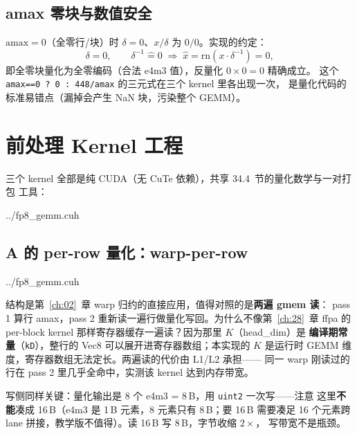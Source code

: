 \subsection{amax 零块与数值安全}

$\mathrm{amax}=0$（全零行/块）时 $\delta=0$、$x/\delta$ 为 $0/0$。实现的约定：
\begin{equation}
  \delta = 0,\qquad \delta^{-1} \mathrel{\hat=} 0
  \;\Longrightarrow\; \hat{x} = \mathrm{rn}(x\cdot\delta^{-1}) = 0,
\end{equation}
即全零块量化为全零编码（合法 e4m3 值），反量化 $0\times 0 = 0$ 精确成立。
这个 \texttt{amax==0 ? 0 : 448/amax} 的三元式在三个 kernel 里各出现一次，
是量化代码的标准易错点（漏掉会产生 NaN 块，污染整个 GEMM）。

\section{前处理 Kernel 工程}\label{sec:34-kernels}

三个 kernel 全部是纯 CUDA（无 CuTe 依赖），共享 34.4~节的量化数学与一对打包
工具：

\begin{lstinputlisting}[linerange={50-82},firstnumber=auto,
  title={fp8\_gemm.cuh L50-82（量化常数、粒度枚举、Vec8 与 e4m3x2 打包）}]{../fp8_gemm.cuh}
\end{lstinputlisting}

\subsection{A 的 per-row 量化：warp-per-row}

\begin{lstinputlisting}[linerange={91-128},firstnumber=auto,
  title={fp8\_gemm.cuh L91-128（quantize\_a\_perrow\_kernel：warp 归约 + 两遍 gmem）}]{../fp8_gemm.cuh}
\end{lstinputlisting}

结构是第~\ref{ch:02}~章 warp 归约的直接应用，值得对照的是\textbf{两遍 gmem 读}：
pass 1 算行 amax，pass 2 重新读一遍行做量化写回。为什么不像第~\ref{ch:28}~章
ffpa 的 per-block kernel 那样寄存器缓存一遍读？因为那里 $K$（head\_dim）是
\textbf{编译期常量}（\texttt{kD}），整行的 Vec8 可以展开进寄存器数组；本实现的
$K$ 是运行时 GEMM 维度，寄存器数组无法定长。两遍读的代价由 L1/L2 承担——
同一 warp 刚读过的行在 pass 2 里几乎全命中，实测该 kernel 达到内存带宽。

写侧同样关键：量化输出是 8 个 e4m3 = 8\,B，用 \texttt{uint2} 一次写——注意
这里\textbf{不能}凑成 16\,B（e4m3 是 1\,B 元素，8 元素只有 8\,B；要 16\,B 需要凑足
16 个元素跨 lane 拼接，教学版不值得）。读 16\,B 写 8\,B，字节收缩 $2\times$，
写带宽不是瓶颈。

